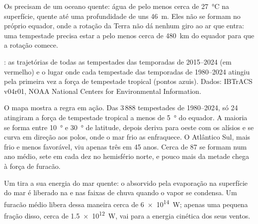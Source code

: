 Os  precisam de um oceano quente: água de pelo menos cerca
de \qty{27}{\degreeCelsius} na superfície, quente até uma profundidade de
uns \qty{46}{m}. Eles não se formam no próprio equador, onde a rotação da
Terra não dá nenhum giro ao ar que entra: uma tempestade precisa estar a
pelo menos cerca de \qty{480}{km} do equador para que a rotação comece.

\begin{omfigure}

{\small {}: as trajetórias de todas as tempestades das
temporadas de 2015--2024 (em vermelho) e o lugar onde cada tempestade das
temporadas de 1980--2024 atingiu pela primeira vez a força de tempestade
tropical (pontos azuis). Dados: IBTrACS v04r01, NOAA National Centers for
Environmental Information.}
\end{omfigure}

O mapa mostra a regra em ação. Das 3\,888 tempestades de 1980--2024, só 24
atingiram a força de tempestade tropical a menos de \qty{5}{\degree} do
equador. A maioria se forma entre \qty{10}{\degree} e \qty{30}{\degree} de
latitude, depois deriva para oeste com os alísios e se curva em direção aos
polos, onde o mar frio as enfraquece. O Atlântico Sul, mais frio e menos
favorável, viu apenas três em 45 anos. Cerca de 87  se
formam num ano médio, sete em cada dez no hemisfério norte, e pouco mais da
metade chega à força de furacão.

\begin{proposition}\label{prop:g10:storms-and-cyclones:energy}
Um  tira a sua energia do mar quente: o 
absorvido pela evaporação na superfície do mar é liberado na 
e nas faixas de chuva quando o vapor se condensa. Um furacão médio libera
dessa maneira cerca de \qty{6e14}{W}; apenas uma pequena fração disso,
cerca de \qty{1.5e12}{W}, vai para a energia cinética dos seus ventos.
\end{proposition}

